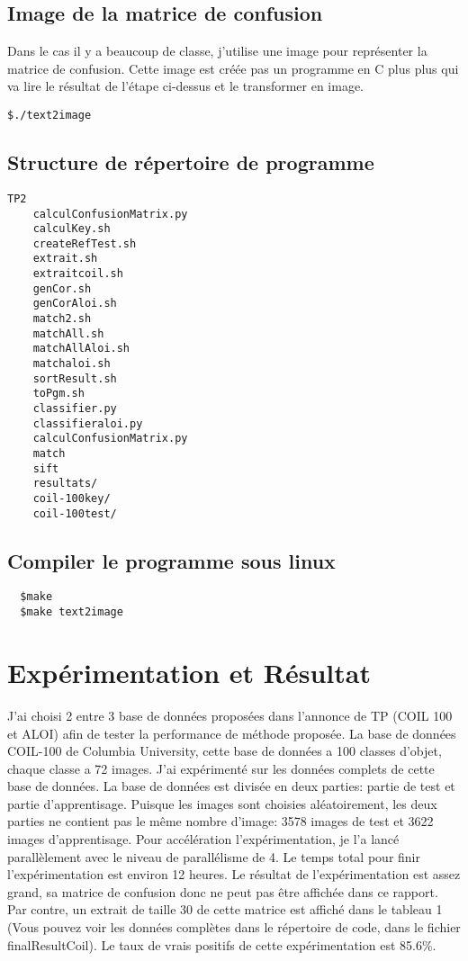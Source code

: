 \documentclass[french,12pt,a4paper,oneside,notitlepage]{report}
\begin{document}
\subsection{Image de la matrice  de confusion}
Dans le cas il y a beaucoup de classe, j'utilise une image pour représenter la matrice de confusion.
Cette image est créée pas un programme en C plus plus qui va lire le résultat de l'étape ci-dessus et le transformer en image.
\begin{lstlisting}
$./text2image
\end{lstlisting}
\clearpage
\subsection{Structure de répertoire de programme}
\begin{lstlisting}[label=structure,caption=Structure de répertoire du programme]
 TP2
	calculConfusionMatrix.py
	calculKey.sh
	createRefTest.sh
	extrait.sh
	extraitcoil.sh
	genCor.sh
	genCorAloi.sh
	match2.sh
	matchAll.sh
	matchAllAloi.sh
	matchaloi.sh
	sortResult.sh
	toPgm.sh
	classifier.py
	classifieraloi.py
	calculConfusionMatrix.py
	match
	sift
	resultats/
	coil-100key/
	coil-100test/
\end{lstlisting}

\subsection{Compiler le programme sous linux}
\begin{lstlisting}
  $make 
  $make text2image
\end{lstlisting}

\clearpage
\section{Expérimentation et Résultat}
J'ai choisi 2 entre 3 base de données proposées dans l'annonce de TP (COIL 100 et ALOI) afin de tester la performance de méthode proposée.
La base de données COIL-100 de Columbia University, cette base de données a 100 classes d'objet, chaque classe a 72 images. J'ai expérimenté sur 
les données complets de cette base de données. La base de données est divisée en deux parties: partie de test et partie d'apprentisage. Puisque 
les images sont choisies aléatoirement, les deux parties ne contient pas le même nombre d'image: 3578 images de test et 3622 images d'apprentisage.
Pour accélération l'expérimentation, je l'a lancé parallèlement avec le niveau de parallélisme de 4. Le temps total pour finir l'expérimentation est
environ 12 heures. Le résultat de l'expérimentation est assez grand, sa matrice de confusion donc ne peut pas être affichée dans ce rapport. Par contre,
un extrait de taille 30 de cette matrice est affiché dans le tableau 1 (Vous pouvez voir les données complètes dans le répertoire de code, dans le fichier 
finalResultCoil). Le taux de vrais positifs de cette expérimentation est 85.6\%.
\end{document}
